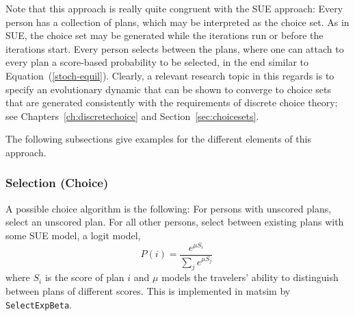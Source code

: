 Note that this approach is really quite congruent with the SUE
approach: Every person has a collection of plans, which may be
interpreted as the choice set.  As in SUE, the choice set may be
generated while the iterations run or before the iterations start.
Every person selects between the plans, where one can attach to
every plan a score-based probability to be selected, 
in the end similar to Equation~(\ref{stoch-equil}).
Clearly, a relevant research topic in this regards is to specify 
an evolutionary dynamic that can be shown to converge to choice sets
that are generated consistently with the requirements of discrete
choice theory; see Chapters~\ref{ch:discretechoice} and Section~\ref{sec:choicesets}.



The following subsections give examples for the different elements of
this approach.


\subsubsection{Selection (Choice)}
\label{sec:ag-based-assignment-selection}

A possible choice algorithm is the following: For persons with
unscored plans, select an unscored plan.  For all other persons,
select between existing plans with some SUE model, \eg a logit
model, \ie
\begin{equation}
P(i) = \frac{e^{\mu S_i}}{\sum_j e^{\mu S_j}} \
\label{eq:2}
\end{equation}
where $S_i$ is the score of plan $i$ and $\mu$ models the
travelers' ability to distinguish between plans of different
scores.
%
This is implemented in \gls{matsim} by \lstinline{SelectExpBeta}.

